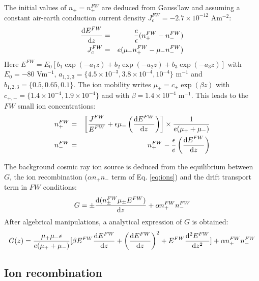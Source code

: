 The initial values of $n_{\pm}=n_{\pm}^{FW}$ are deduced from Gauss'law and assuming a constant air-earth conduction current density $J^{FW}_c=-2.7\times10^{-12}$ Am$^{-2}$:
\begin{eqnarray}\label{eq:FW1}
\frac{{\rm d}E^{FW}}{{\rm d}z}&=&\frac{\displaystyle e}{\displaystyle \epsilon}(n_+^{FW}-n_-^{FW}) \\
J^{FW}_c&=&e(\mu_+n_+^{FW}-\mu_-n_-^{FW})
\end{eqnarray}
Here $E^{FW}=E_0 [b_1 \exp(-a_1z)+b_2 \exp(-a_2z)+b_3 \exp(-a_3z)]$ with $E_0=-80$ Vm$^{-1}$, $a_{1,2,3}=\{4.5\times10^{-3}, 3.8\times10^{-4}, 10^{-4}\}$ m$^{-1}$ and $b_{1,2,3}=\{0.5, 0.65, 0.1\}$. The ion mobility writes $\mu_{\pm} = c_{\pm} \exp(\beta z)$ with $c_{+,-}=\{1.4\times10^{-4},1.9\times10^{-4}\}$ and with $\beta=1.4\times10^{-4}$ m$^{-1}$. This leads to the $FW$ small ion concentrations:
\begin{eqnarray}\label{eq:FW2}
  n_+^{FW} &=& \left[ \frac{\displaystyle J^{FW}}{\displaystyle E^{FW}} + \epsilon \mu_- \left(\frac{\displaystyle{{\rm d} E^{FW}}}{\displaystyle{{\rm d} z}}\right) \right] \times \frac{\displaystyle 1}{\displaystyle e(\mu_+ + \mu_-)} \\
  n_-^{FW} &=& n_+^{FW} - \frac{\displaystyle{\epsilon}}{\displaystyle e}\left(\frac{\displaystyle{{\rm d} E^{FW}}}{\displaystyle{{\rm d} z}}\right)
\end{eqnarray}

The background cosmic ray ion source is deduced from the equilibrium between $G$, the ion recombination ($\alpha n_+ n_-$ term of Eq. \ref{eq:ions}) and the drift transport term in $FW$ conditions:
\begin{equation}\label{eq:G1}
G=\pm \frac{{\rm d} (n_{\pm}^{FW} \mu _{\pm} E^{FW})}{{\rm d}z} + \alpha n_+^{FW} n_-^{FW}
\end{equation}
After algebrical manipulations, a analytical expression of $G$ is obtained:
\begin{displaymath}\label{eq:G2}
  G(z) = \frac{\mu_+ \mu_- \epsilon}{e(\mu_+ + \mu_-)}[\beta E^{FW} \frac{{\rm d}E^{FW}}{{\rm d}z} + \bigg(\frac{{\rm d}E^{FW}}{{\rm d}z}\bigg)^2 + E^{FW} \frac{{\rm d}^2E^{FW}}{{\rm d}z^2}] + \alpha n_+^{FW} n_-^{FW}
\end{displaymath}

\subsection{Ion recombination}

